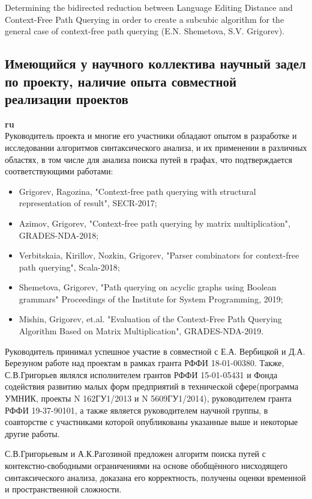 \documentclass[12pt]{article}  %
\theoremstyle{remark}
\begin{document}
Determining the bidirected reduction between Language Editing Distance and Context-Free Path Querying in order to create a subcubic algorithm for the general case of context-free path querying (E.N. Shemetova, S.V. Grigorev).

\subsection{Имеющийся у научного коллектива научный задел по проекту, наличие опыта совместной реализации проектов}

\textbf{ru}\\
%
Руководитель проекта и многие его участники обладают опытом в разработке и исследовании алгоритмов синтаксического анализа, и их применении в различных областях, в том числе для анализа поиска путей в графах, что подтверждается соответствующими работами:
\begin{itemize}
  \item Grigorev, Ragozina, "Context-free path querying with structural representation of result", SECR-2017;
  \item Azimov, Grigorev, "Context-free path querying by matrix multiplication", GRADES-NDA-2018;
  \item Verbitskaia, Kirillov, Nozkin, Grigorev, "Parser combinators for context-free path querying", Scala-2018;
  \item Shemetova, Grigorev, "Path querying on acyclic graphs using Boolean grammars" Proceedings of the Institute for System Programming, 2019;
  \item Mishin, Grigorev, et.al. "Evaluation of the Context-Free Path Querying Algorithm Based on Matrix Multiplication", GRADES-NDA-2019.
\end{itemize}

Руководитель принимал успешное участие в совместной с Е.А. Вербицкой и Д.А. Березуном работе над проектам в рамках гранта РФФИ 18-01-00380.
Также, С.В.Григорьев являлся исполнителем грантов РФФИ 15-01-05431 и Фонда содействия развитию малых форм предприятий в технической сфере(программа УМНИК, проекты N 162ГУ1/2013 и N 5609ГУ1/2014), руководителем гранта РФФИ 19-37-90101, а также является руководителем научной группы, в соавторстве с участниками которой опубликованы указанные выше и некоторые другие работы.

С.В.Григорьевым и А.К.Рагозиной предложен алгоритм поиска путей с контекстно-свободными ограничениями на основе обобщённого нисходящего синтаксического анализа, доказана его корректность, получены оценки временной и пространственной сложности.
\end{document}
